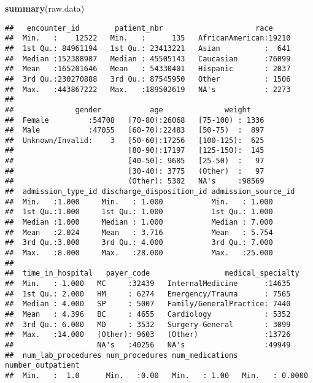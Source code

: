 \documentclass[]{article}
\newenvironment{Shaded}{\begin{snugshade}}{\end{snugshade}}
\newcommand{\KeywordTok}[1]{\textcolor[rgb]{0.13,0.29,0.53}{\textbf{#1}}}
\newcommand{\NormalTok}[1]{#1}
\begin{document}
\begin{Shaded}
\begin{Highlighting}[]
\KeywordTok{summary}\NormalTok{(raw.data)}
\end{Highlighting}
\end{Shaded}

\begin{verbatim}
##   encounter_id        patient_nbr                     race      
##  Min.   :    12522   Min.   :      135   AfricanAmerican:19210  
##  1st Qu.: 84961194   1st Qu.: 23413221   Asian          :  641  
##  Median :152388987   Median : 45505143   Caucasian      :76099  
##  Mean   :165201646   Mean   : 54330401   Hispanic       : 2037  
##  3rd Qu.:230270888   3rd Qu.: 87545950   Other          : 1506  
##  Max.   :443867222   Max.   :189502619   NA's           : 2273  
##                                                                 
##              gender           age              weight     
##  Female         :54708   [70-80):26068   [75-100) : 1336  
##  Male           :47055   [60-70):22483   [50-75)  :  897  
##  Unknown/Invalid:    3   [50-60):17256   [100-125):  625  
##                          [80-90):17197   [125-150):  145  
##                          [40-50): 9685   [25-50)  :   97  
##                          [30-40): 3775   (Other)  :   97  
##                          (Other): 5302   NA's     :98569  
##  admission_type_id discharge_disposition_id admission_source_id
##  Min.   :1.000     Min.   : 1.000           Min.   : 1.000     
##  1st Qu.:1.000     1st Qu.: 1.000           1st Qu.: 1.000     
##  Median :1.000     Median : 1.000           Median : 7.000     
##  Mean   :2.024     Mean   : 3.716           Mean   : 5.754     
##  3rd Qu.:3.000     3rd Qu.: 4.000           3rd Qu.: 7.000     
##  Max.   :8.000     Max.   :28.000           Max.   :25.000     
##                                                                
##  time_in_hospital   payer_code                 medical_specialty
##  Min.   : 1.000   MC     :32439   InternalMedicine      :14635  
##  1st Qu.: 2.000   HM     : 6274   Emergency/Trauma      : 7565  
##  Median : 4.000   SP     : 5007   Family/GeneralPractice: 7440  
##  Mean   : 4.396   BC     : 4655   Cardiology            : 5352  
##  3rd Qu.: 6.000   MD     : 3532   Surgery-General       : 3099  
##  Max.   :14.000   (Other): 9603   (Other)               :13726  
##                   NA's   :40256   NA's                  :49949  
##  num_lab_procedures num_procedures num_medications number_outpatient
##  Min.   :  1.0      Min.   :0.00   Min.   : 1.00   Min.   : 0.0000  

\end{verbatim}
\end{document}

